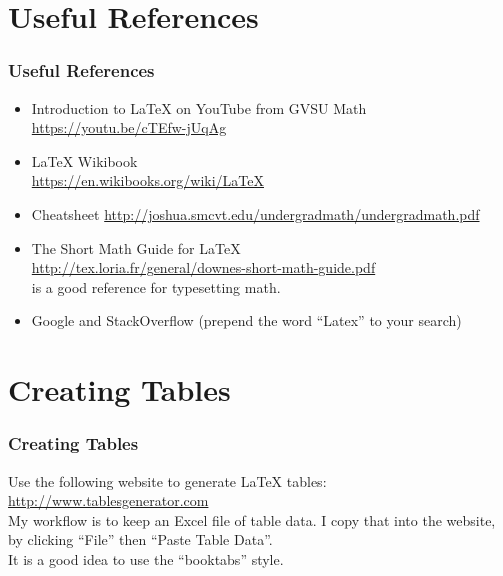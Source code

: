 \documentclass{beamer}
\begin{document}
\section{Useful References}
\begin{frame}
  \frametitle{Useful References}


  \begin{itemize}
    \item
      Introduction to \LaTeX{} on YouTube from GVSU Math\\
      \url{https://youtu.be/cTEfw-jUqAg}

    \item
      \LaTeX{} Wikibook\\
      \url{https://en.wikibooks.org/wiki/LaTeX}

    \item
      Cheatsheet
      \url{http://joshua.smcvt.edu/undergradmath/undergradmath.pdf}

    \item
      The Short Math Guide for \LaTeX{}\\
      \url{http://tex.loria.fr/general/downes-short-math-guide.pdf}\\
      is a good reference for typesetting math.


      \item
        Google and StackOverflow (prepend the word ``Latex'' to your search)
  \end{itemize}

\end{frame}


\section{Creating Tables}
\begin{frame}
  \frametitle{Creating Tables}

  Use the following website to generate \LaTeX{} tables:
  \url{http://www.tablesgenerator.com}\\

  My workflow is to keep an Excel file of table data. I copy that into the
  website, by clicking ``File'' then ``Paste Table Data''.\\

  It is a good idea to use the ``booktabs'' style.


\end{frame}
\end{document}
